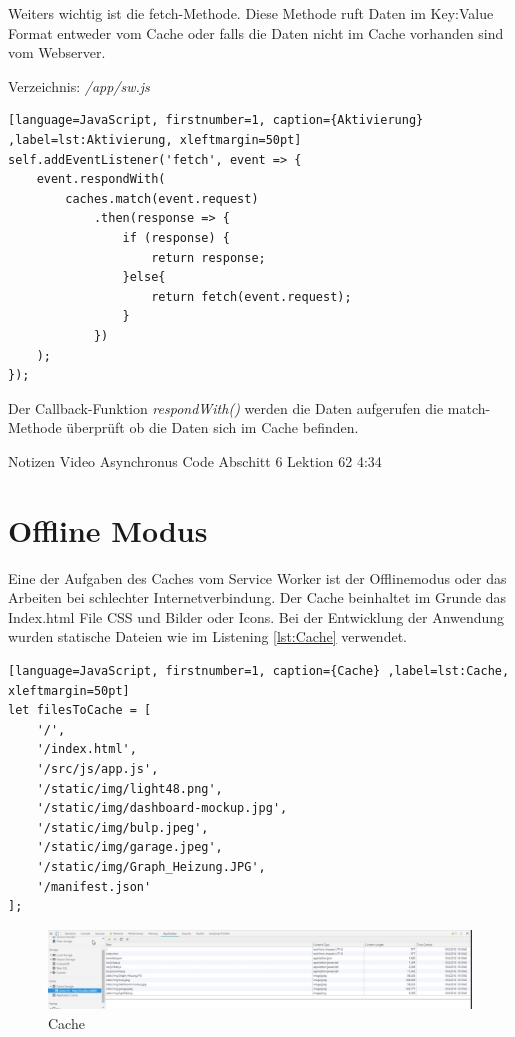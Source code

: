 Weiters wichtig ist die fetch-Methode. Diese Methode ruft Daten im Key:Value Format entweder vom Cache oder falls die Daten nicht im Cache vorhanden sind vom Webserver.

Verzeichnis: \textit{/app/sw.js}

\begin{lstlisting}[language=JavaScript, firstnumber=1, caption={Aktivierung} ,label=lst:Aktivierung, xleftmargin=50pt]
self.addEventListener('fetch', event => {
    event.respondWith(
        caches.match(event.request)
            .then(response => {
                if (response) {
                    return response;
                }else{
                    return fetch(event.request);
                }
            })
    );
});
\end{lstlisting}

Der Callback-Funktion \textit{respondWith()} werden die Daten aufgerufen die match-Methode überprüft ob die Daten sich im Cache befinden.

		
Notizen Video
	Asynchronus Code Abschitt 6 Lektion 62 4:34 
	 

\section{Offline Modus}
Eine der Aufgaben des Caches vom Service Worker ist der Offlinemodus oder das Arbeiten bei schlechter Internetverbindung. Der Cache  beinhaltet im Grunde das Index.html File CSS und Bilder oder Icons. Bei der Entwicklung der Anwendung wurden statische Dateien wie im Listening \ref{lst:Cache} verwendet.


\begin{lstlisting}[language=JavaScript, firstnumber=1, caption={Cache} ,label=lst:Cache, xleftmargin=50pt]
let filesToCache = [
    '/',
    '/index.html',
    '/src/js/app.js',
    '/static/img/light48.png',
    '/static/img/dashboard-mockup.jpg',
    '/static/img/bulp.jpeg',
    '/static/img/garage.jpeg',
    '/static/img/Graph_Heizung.JPG',
    '/manifest.json'
];
\end{lstlisting}


\begin{figure}[h]
	\centering
	\includegraphics[width=16cm]{BilderAllgemein/Implementierung/Cache.jpg}\medskip
	\caption{Cache}
	\label{fig:Cache}
\end{figure}  

